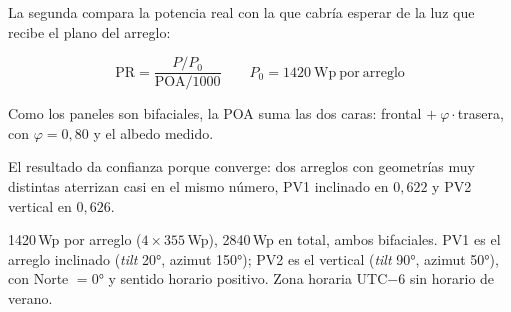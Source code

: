 La segunda compara la potencia real con la que cabría esperar de la luz que recibe el
plano del arreglo:

\begin{equation*}
  \mathrm{PR} = \frac{P/P_0}{\mathrm{POA}/1000}
  \qquad P_0 = 1420\ \mathrm{Wp\ por\ arreglo}
\end{equation*}

Como los paneles son bifaciales, la POA suma las dos caras: frontal $+\ \varphi\cdot$trasera,
con $\varphi = 0{,}80$ y el albedo medido.

El resultado da confianza porque converge: dos arreglos con geometrías muy distintas
aterrizan casi en el mismo número, PV1 inclinado en $0{,}622$ y PV2 vertical en $0{,}626$.

\begin{clave}[title=Geometría confirmada del sitio]
1420\,Wp por arreglo ($4 \times 355$\,Wp), 2840\,Wp en total, ambos bifaciales.
PV1 es el arreglo inclinado (\emph{tilt} 20°, azimut 150°); PV2 es el vertical
(\emph{tilt} 90°, azimut 50°), con Norte $=0$° y sentido horario positivo. Zona horaria
UTC$-6$ sin horario de verano.
\end{clave}
